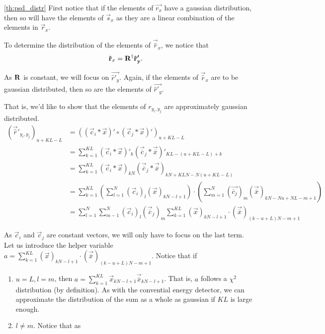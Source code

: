 \documentclass[a4paper, openany, oneside]{memoir}
\begin{document}
\begin{blockProofTheorem}{\ref{th:psd_distr}}
First notice that if the elements of $\vec{r_x}$ have a gaussian distribution, then so will have the elements of $\vec{s}_x$ as they are a linear combination of the elements in $\vec{r}_x$.

To determine the distribution of the elements of $\vec{\hat{r}}_x$, we notice that 
\begin{align*}
\boldsymbol{\mathbf{\hat{r}}}_x &= \boldsymbol{\mathbf{R}}^{\dagger}\boldsymbol{\mathbf{\hat{r}'_y}}.
\end{align*}

As $\boldsymbol{\mathbf{R}}$ is constant, we will focus on $\vec{\hat{r}'_y}$. Again, if the elements of $\vec{\hat{r}}_x$ are to be gaussian distributed, then so are the elements of $\vec{\hat{r}'_y}$.

That is, we'd like to show that the elements of $r_{y_i,y_j}$ are approximately gaussian distributed.
\begin{align*}
(\vec{\hat{r}}'_{y_i,y_j})_{u+KL-L} &= \left(\left(\vec{c}_i\ast\vec{x}\right)' \circ \left(\vec{c}_j\ast\vec{x}\right)' \right)_{u+KL-L} \\
&= \sum_{k=1}^{KL} \left(\vec{c}_i\ast\vec{x}\right)'_k \left(\vec{\overline{c}}_j\ast\vec{\overline{x}}\right)'_{KL-(u+KL-L)+k} \\
&= \sum_{k=1}^{KL} \left(\vec{c}_i\ast\vec{x}\right)_{kN} \left(\vec{\overline{c}}_j\ast\vec{\overline{x}}\right)_{kN+KLN-N(u+KL-L)}\\
&=  \sum_{k=1}^{KL} \left(\sum_{l=1}^N \left(\vec{c}_i\right)_l\left(\vec{x}\right)_{kN-l+1}\right) \cdot \left(\sum_{m=1}^{N} \left(\vec{\overline{c}_j}\right)_m\left(\vec{\overline{x}}\right)_{kN - Nu + NL - m+1}\right)\\
&= \sum_{l=1}^N\sum_{m-1}^N \left(\vec{c}_i\right)_l \left(\vec{\overline{c}}_j\right)_m \sum_{k=1}^{KL} (\vec{x})_{kN-l+1} \cdot (\vec{\overline{x}})_{(k-u+L)N - m+1}
\end{align*}

As $\vec{c}_i$ and $\vec{c}_j$ are constant vectors, we will only have to focus on the last term. Let us introduce the helper variable $a =  \sum_{k=1}^{KL} (\vec{x})_{kN-l+1} \cdot (\vec{\overline{x}})_{(k-u+L)N - m+1}$. Notice that if

\begin{enumerate}
	\item $u=L, l=m$, then $a = \sum_{k=1}^{KL}\vec{x}_{kN-l+1}\vec{\overline{x}}_{kN-l+1}$. That is, $a$ follows a $\chi^2$ distribution (by definition). As with the convential energy detector, we can approximate the distribution of the sum as a whole as gaussian if $KL$ is large enough.
	\item $l \neq m$. Notice that as 


\end{enumerate}
\end{blockProofTheorem}
\end{document}
